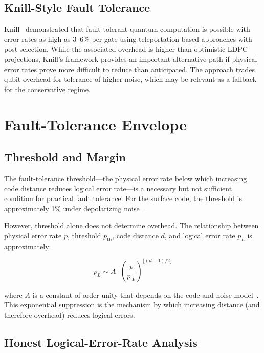 \documentclass[conference]{IEEEtran}
\begin{document}
\subsection{Knill-Style Fault Tolerance}

Knill~\cite{knill2005} demonstrated that fault-tolerant quantum computation is possible with error rates as high as 3--6\% per gate using teleportation-based approaches with post-selection. While the associated overhead is higher than optimistic LDPC projections, Knill's framework provides an important alternative path if physical error rates prove more difficult to reduce than anticipated. The approach trades qubit overhead for tolerance of higher noise, which may be relevant as a fallback for the conservative regime.

\section{Fault-Tolerance Envelope}

\subsection{Threshold and Margin}

The fault-tolerance threshold---the physical error rate below which increasing code distance reduces logical error rate---is a necessary but not sufficient condition for practical fault tolerance. For the surface code, the threshold is approximately 1\% under depolarizing noise~\cite{fowler2012, dennis2002}.

However, threshold alone does not determine overhead. The relationship between physical error rate $p$, threshold $p_{\text{th}}$, code distance $d$, and logical error rate $p_L$ is approximately:

\begin{equation}
p_L \sim A \cdot \left(\frac{p}{p_{\text{th}}}\right)^{\lfloor(d+1)/2\rfloor}
\end{equation}

where $A$ is a constant of order unity that depends on the code and noise model~\cite{fowler2012, gottesman1997}. This exponential suppression is the mechanism by which increasing distance (and therefore overhead) reduces logical errors.

\subsection{Honest Logical-Error-Rate Analysis}
\end{document}

